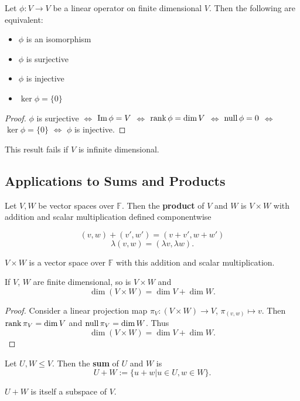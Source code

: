 \begin{theorem}
  Let $\phi : V \rightarrow V$ be a linear operator on finite dimensional $V$. Then the following are equivalent:
  \begin{itemize}
    \item $\phi$ is an isomorphism
    \item $\phi$ is surjective
    \item $\phi$ is injective
    \item $\ker \phi = \{0\}$
  \end{itemize}
\end{theorem}
\begin{proof}
  $\phi$ is surjective $\iff$ $\operatorname{Im} \phi = V$ $\iff$ $\operatorname{rank} \phi = \dim V$ $\iff$ $\operatorname{null} \phi = 0$ $\iff$ $\ker \phi = \{0\}$ $\iff$ $\phi$ is injective.
\end{proof}

\begin{remark}
    This result fails if $V$ is infinite dimensional.
\end{remark}

\subsection{Applications to Sums and Products}

\begin{definition}
  Let $V, W$ be vector spaces over $\mathbb{F}$. Then the {\bf product} of $V$ and $W$ is $V \times W$ with addition and scalar multiplication defined componentwise

  \[(v, w) + (v', w') = (v + v', w + w')\]
  \[\lambda (v, w) = (\lambda v, \lambda w).\]

  $V \times W$ is a vector space over $\mathbb{F}$ with this addition and scalar multiplication.
    
\end{definition}

\begin{prop}
    If $V$, $W$ are finite dimensional, so is $V \times W$ and
    \[\dim (V \times W) = \dim V + \dim W.\]
\end{prop}
\begin{proof}
    Consider a linear projection map $\pi_V : (V \times W) \rightarrow V$, $\pi_(v, w) \mapsto v$. Then $\operatorname{rank} \pi_V = \dim V$ and $\operatorname{null} \pi_V = \dim W$. Thus
    \[\dim (V \times W) = \dim V + \dim W.\]
\end{proof}

\begin{definition}
  Let $U, W \leq V$. Then the {\bf sum} of $U$ and $W$ is
  \[U + W := \{u + w | u \in U, w \in W\}.\]
\end{definition}
\begin{remark}
    $U + W$ is itself a subspace of $V$.
\end{remark}

